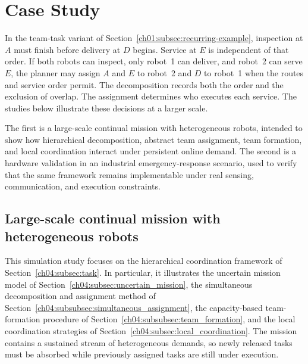 \section{Case Study}
\label{sec:ch04_case_study}

\begin{revision}
In the team-task variant of Section~\ref{ch01:subsec:recurring-example},
inspection at $A$ must finish before delivery at $D$ begins.
Service at $E$ is independent of that order.
If both robots can inspect, only robot~1 can deliver, and robot~2 can
serve $E$, the planner may assign $A$ and $E$ to robot~2 and $D$ to
robot~1 when the routes and service order permit. The decomposition
records both the order and the exclusion of overlap. The assignment
determines who executes each service. The studies below illustrate these decisions at
a larger scale.
\end{revision}

 The first is a large-scale
continual mission with heterogeneous robots, intended to show how
hierarchical decomposition, abstract team assignment, team formation,
and local coordination interact under persistent online demand. The
second is a hardware validation in an industrial emergency-response
scenario, used to verify that the same framework remains implementable
under real sensing, communication, and execution constraints.

\subsection{Large-scale continual mission with heterogeneous robots}
\label{ch04:subsec:case_large_scale}

This simulation study focuses on the hierarchical coordination framework
of Section~\ref{ch04:subsec:task}. In particular, it illustrates the
uncertain mission model of Section~\ref{ch04:subsec:uncertain_mission},
the simultaneous decomposition and assignment method of
Section~\ref{ch04:subsubsec:simultaneous_assignment}, the
capacity-based team-formation procedure of
Section~\ref{ch04:subsubsec:team_formation}, and the local
coordination strategies of Section~\ref{ch04:subsec:local_coordination}.
The mission contains a sustained stream of heterogeneous demands, so
newly released tasks must be absorbed while previously assigned tasks
are still under execution.

